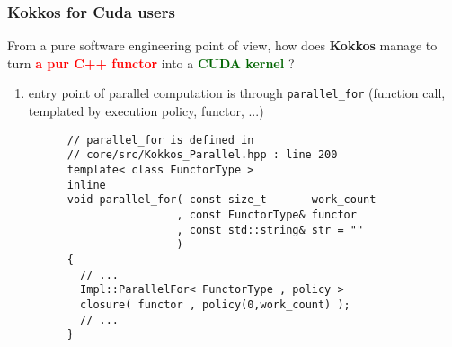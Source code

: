 \begin{frame}[fragile=singleslide]
  \frametitle{Kokkos for Cuda users}

  From a pure software engineering point of view, how does {\bf Kokkos} manage to turn \textcolor{red}{\bf a pur C++ functor} into a \textcolor{darkgreen}{\bf CUDA kernel} ?
  
  \begin{enumerate}
  \item entry point of parallel computation is through \texttt{parallel\_for} (function call, templated by execution policy, functor, ...)
    \begin{verbatim}
      // parallel_for is defined in 
      // core/src/Kokkos_Parallel.hpp : line 200
      template< class FunctorType >
      inline
      void parallel_for( const size_t       work_count
                       , const FunctorType& functor
                       , const std::string& str = ""
                       )
      {
        // ...
        Impl::ParallelFor< FunctorType , policy > 
        closure( functor , policy(0,work_count) );
        // ...
      }
    \end{verbatim}
  \end{enumerate}

\end{frame}

